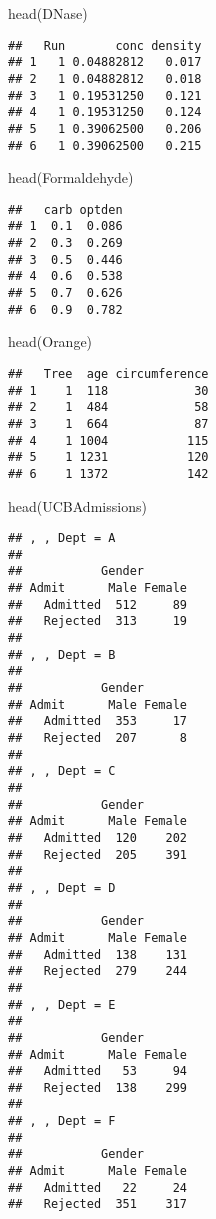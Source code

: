 \documentclass[
]{article}
\newenvironment{Shaded}{\begin{snugshade}}{\end{snugshade}}
\newcommand{\FunctionTok}[1]{\textcolor[rgb]{0.00,0.00,0.00}{#1}}
\newcommand{\NormalTok}[1]{#1}
\begin{document}
\begin{Shaded}
\begin{Highlighting}[]
\FunctionTok{head}\NormalTok{(DNase)}
\end{Highlighting}
\end{Shaded}

\begin{verbatim}
##   Run       conc density
## 1   1 0.04882812   0.017
## 2   1 0.04882812   0.018
## 3   1 0.19531250   0.121
## 4   1 0.19531250   0.124
## 5   1 0.39062500   0.206
## 6   1 0.39062500   0.215
\end{verbatim}

\begin{Shaded}
\begin{Highlighting}[]
\FunctionTok{head}\NormalTok{(Formaldehyde)}
\end{Highlighting}
\end{Shaded}

\begin{verbatim}
##   carb optden
## 1  0.1  0.086
## 2  0.3  0.269
## 3  0.5  0.446
## 4  0.6  0.538
## 5  0.7  0.626
## 6  0.9  0.782
\end{verbatim}

\begin{Shaded}
\begin{Highlighting}[]
\FunctionTok{head}\NormalTok{(Orange)}
\end{Highlighting}
\end{Shaded}

\begin{verbatim}
##   Tree  age circumference
## 1    1  118            30
## 2    1  484            58
## 3    1  664            87
## 4    1 1004           115
## 5    1 1231           120
## 6    1 1372           142
\end{verbatim}

\begin{Shaded}
\begin{Highlighting}[]
\FunctionTok{head}\NormalTok{(UCBAdmissions)}
\end{Highlighting}
\end{Shaded}

\begin{verbatim}
## , , Dept = A
## 
##           Gender
## Admit      Male Female
##   Admitted  512     89
##   Rejected  313     19
## 
## , , Dept = B
## 
##           Gender
## Admit      Male Female
##   Admitted  353     17
##   Rejected  207      8
## 
## , , Dept = C
## 
##           Gender
## Admit      Male Female
##   Admitted  120    202
##   Rejected  205    391
## 
## , , Dept = D
## 
##           Gender
## Admit      Male Female
##   Admitted  138    131
##   Rejected  279    244
## 
## , , Dept = E
## 
##           Gender
## Admit      Male Female
##   Admitted   53     94
##   Rejected  138    299
## 
## , , Dept = F
## 
##           Gender
## Admit      Male Female
##   Admitted   22     24
##   Rejected  351    317
\end{verbatim}
\end{document}
